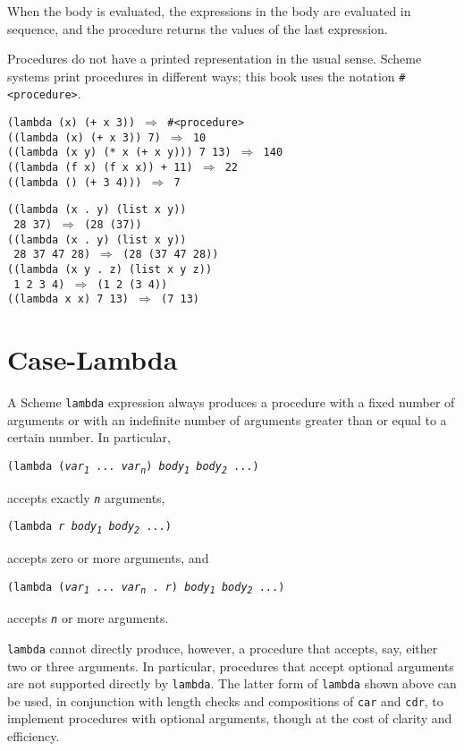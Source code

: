 When the body is evaluated, the expressions in the body are evaluated in sequence,
and the procedure returns the values of the last expression.


Procedures do not have a printed representation in the usual sense.
Scheme systems print procedures in different ways; this book uses the
notation \texttt{\#{}\textless{}procedure\textgreater{}}.


\begin{alltt}
(lambda (x) (+ x 3)) \(\Rightarrow\) \#{}\textless{}procedure\textgreater{}
((lambda (x) (+ x 3)) 7) \(\Rightarrow\) 10
((lambda (x y) (* x (+ x y))) 7 13) \(\Rightarrow\) 140
((lambda (f x) (f x x)) + 11) \(\Rightarrow\) 22
((lambda () (+ 3 4))) \(\Rightarrow\) 7

((lambda (x . y) (list x y))
 28 37) \(\Rightarrow\) (28 (37))
((lambda (x . y) (list x y))
 28 37 47 28) \(\Rightarrow\) (28 (37 47 28))
((lambda (x y . z) (list x y z))
 1 2 3 4) \(\Rightarrow\) (1 2 (3 4))
((lambda x x) 7 13) \(\Rightarrow\) (7 13)
\end{alltt}

\section{\label{binding_g91}\label{binding_h3}Case-Lambda\label{binding_SECTOPTARGS}}



A Scheme \label{binding_s9}\texttt{lambda} expression always
produces a procedure with a fixed number of arguments or with an
indefinite number of arguments greater than or equal to a certain
number.
In particular,


\texttt{(lambda (\textit{var\textsubscript{1}} ... \textit{var\textsubscript{n}}) \textit{body\textsubscript{1}} \textit{body\textsubscript{2}} ...)}

accepts exactly \texttt{\textit{n}} arguments,


\texttt{(lambda \textit{r} \textit{body\textsubscript{1}} \textit{body\textsubscript{2}} ...)}

accepts zero or more arguments, and


\texttt{(lambda (\textit{var\textsubscript{1}} ... \textit{var\textsubscript{n}} . \textit{r}) \textit{body\textsubscript{1}} \textit{body\textsubscript{2}} ...)}

accepts \texttt{\textit{n}} or more arguments.

\texttt{lambda} cannot directly produce, however, a procedure that accepts,
say, either two or three arguments.
In particular, procedures that accept \label{binding_s10}optional arguments are not
supported directly by \texttt{lambda}.
The latter form of \texttt{lambda} shown above can be used, in conjunction
with length checks and compositions of \texttt{car} and \texttt{cdr}, to implement
procedures with optional arguments, though at the cost of clarity and
efficiency.

